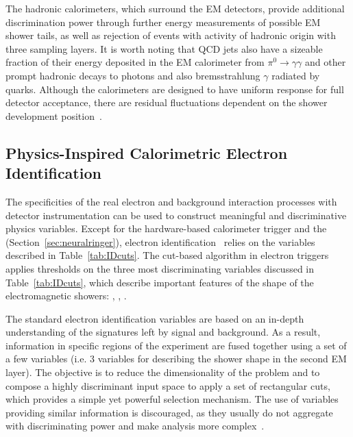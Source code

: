 The hadronic calorimeters, which surround the EM detectors,
provide additional discrimination power through further energy measurements of
possible EM shower tails, as well as rejection of events with activity of
hadronic origin with three sampling layers. It is worth noting that QCD jets also have a sizeable fraction of their energy deposited in the EM calorimeter from $\pi^{0}\rightarrow\gamma\gamma$
and other prompt hadronic decays to photons and also bremsstrahlung $\gamma$ radiated by quarks.
Although the calorimeters are designed 
to have uniform response for full detector acceptance, there are residual fluctuations 
dependent on the shower development position~\cite{Wigmans2017}.



\subsection{Physics-Inspired Calorimetric Electron Identification}\label{ssec:std_variables}

The specificities of the real electron and background interaction processes with
detector instrumentation can be used to construct meaningful and discriminative physics variables. Except for the hardware-based calorimeter trigger
and the \rnn (Section~\ref{sec:neuralringer}), electron
identification~\cite{atlas_electron_id_offline} relies on the variables
described in Table~\ref{tab:IDcuts}. 
The cut-based algorithm in electron
triggers applies thresholds on the three most discriminating variables discussed in Table~\ref{tab:IDcuts}, which describe important features of the shape of the electromagnetic showers: \reta{}, \eratio{}, \rhadone{}.




  
The standard electron identification variables are based on an in-depth
understanding of the signatures left by signal and background.  As a result, information in specific regions of the experiment
are fused together using a set of a few variables (i.e. 3 variables for describing the shower shape in the second EM layer). The objective is to reduce the dimensionality of the problem and to compose a highly discriminant input space to apply a set of rectangular cuts, which provides a simple yet powerful selection mechanism. The use of variables providing similar information is discouraged, as they usually do not aggregate with
discriminating power and make analysis more
complex~\cite{aaboud2019electron}.

